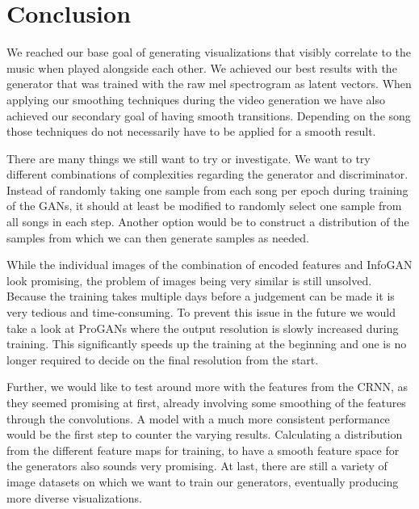 \chapter{Conclusion}

    We reached our base goal of generating visualizations that visibly correlate to the music when played alongside each other. We achieved our best results with the generator that was trained with the raw mel spectrogram as latent vectors. When applying our smoothing techniques during the video generation we have also achieved our secondary goal of having smooth transitions. Depending on the song those techniques do not necessarily have to be applied for a smooth result.

    There are many things we still want to try or investigate. We want to try different combinations of complexities regarding the generator and discriminator. Instead of randomly taking one sample from each song per epoch during training of the GANs, it should at least be modified to randomly select one sample from all songs in each step. Another option would be to construct a distribution of the samples from which we can then generate samples as needed.
    
    While the individual images of the combination of encoded features and InfoGAN look promising, the problem of images being very similar is still unsolved. Because the training takes multiple days before a judgement can be made it is very tedious and time-consuming. To prevent this issue in the future we would take a look at ProGANs where the output resolution is slowly increased during training. This significantly speeds up the training at the beginning and one is no longer required to decide on the final resolution from the start.

    Further, we would like to test around more with the features from the CRNN, as they seemed promising at first, already involving some smoothing of the features through the convolutions. A model with a much more consistent performance would be the first step to counter the varying results. Calculating a distribution from the different feature maps for training, to have a smooth feature space for the generators also sounds very promising. At last, there are still a variety of image datasets on which we want to train our generators, eventually producing more diverse visualizations.